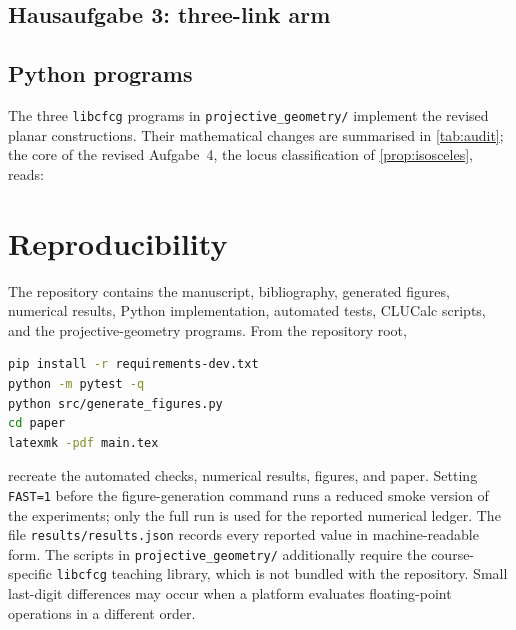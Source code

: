 \documentclass[11pt,a4paper]{article}
\theoremstyle{plain}
\theoremstyle{definition}
\theoremstyle{remark}
\begin{document}
\subsection{Hausaufgabe 3: three-link arm}


\subsection{Python programs}

The three \texttt{libcfcg} programs in
\texttt{projective\_geometry/} implement the revised planar constructions.
Their mathematical changes are summarised in \cref{tab:audit}; the core of the
revised Aufgabe~4, the locus classification of \cref{prop:isosceles}, reads:


\section{Reproducibility}\label{app:reproducibility}

The repository contains the manuscript, bibliography, generated figures,
numerical results, Python implementation, automated tests, CLUCalc scripts, and
the projective-geometry programs. From the repository root,
\begin{lstlisting}[language=bash,numbers=none]
pip install -r requirements-dev.txt
python -m pytest -q
python src/generate_figures.py
cd paper
latexmk -pdf main.tex
\end{lstlisting}
recreate the automated checks, numerical results, figures, and paper. Setting
\texttt{FAST=1} before the figure-generation command runs a reduced smoke
version of the experiments; only the full run is used for the reported
numerical ledger. The file \texttt{results/results.json} records every
reported value in machine-readable form. The scripts in
\texttt{projective\_geometry/} additionally require the course-specific
\texttt{libcfcg} teaching library, which is not bundled with the repository.
Small last-digit differences may occur when a platform evaluates
floating-point operations in a different order.

\clearpage



\clearpage
\listoffigures

\clearpage
\listoftables
\end{document}
